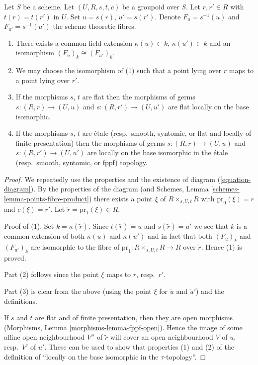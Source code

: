 \begin{lemma}
\label{lemma-two-fibres}
Let $S$ be a scheme.
Let $(U, R, s, t, c)$ be a groupoid over $S$.
Let $r, r' \in R$ with $t(r) = t(r')$ in $U$.
Set $u = s(r)$, $u' = s(r')$.
Denote $F_u = s^{-1}(u)$ and $F_{u'} = s^{-1}(u')$ the scheme
theoretic fibres.
\begin{enumerate}
\item There exists a common field extension
$\kappa(u) \subset k$, $\kappa(u') \subset k$ and
an isomorphism $(F_u)_k \cong (F_{u'})_k$.
\item We may choose the isomorphism of (1) such that a point
lying over $r$ maps to a point lying over $r'$.
\item If the morphisms $s$, $t$ are flat then the morphisms of germs
$s : (R, r) \to (U, u)$ and $s : (R, r') \to (U, u')$ are flat
locally on the base isomorphic.
\item If the morphisms $s$, $t$ are \'etale
(resp.\ smooth, syntomic, or flat and locally of finite presentation)
then the morphisms of germs $s : (R, r) \to (U, u)$ and
$s : (R, r') \to (U, u')$ are locally on the base isomorphic
in the \'etale (resp.\ smooth, syntomic, or fppf) topology.
\end{enumerate}
\end{lemma}

\begin{proof}
We repeatedly use the properties and the existence of
diagram (\ref{equation-diagram}).
By the properties of the diagram (and
Schemes, Lemma \ref{schemes-lemma-points-fibre-product})
there exists a point $\xi$ of $R \times_{s, U, t} R$
with $\text{pr}_0(\xi) = r$ and $c(\xi) = r'$.
Let $\tilde r = \text{pr}_1(\xi) \in R$.

\medskip\noindent
Proof of (1). Set $k = \kappa(\tilde r)$. Since $t(\tilde r) = u$
and $s(\tilde r) = u'$ we see that $k$ is a common extension
of both $\kappa(u)$ and $\kappa(u')$ and in fact that
both $(F_u)_k$ and $(F_{u'})_k$ are isomorphic to the fibre of
$\text{pr}_1 : R \times_{s, U, t} R \to R$ over $\tilde r$.
Hence (1) is proved.

\medskip\noindent
Part (2) follows since the point $\xi$ maps to $r$, resp.\ $r'$.

\medskip\noindent
Part (3) is clear from the above (using the point $\xi$ for
$\tilde u$ and $\tilde u'$) and the definitions.

\medskip\noindent
If $s$ and $t$ are flat and of finite presentation, then
they are open morphisms (Morphisms, Lemma \ref{morphisms-lemma-fppf-open}).
Hence the image of some affine open neighbourhood $V''$ of $\tilde r$ will
cover an open neighbourhood $V$ of $u$, resp.\ $V'$ of $u'$.
These can be used to show that properties (1) and (2) of the
definition of ``locally on the base isomorphic in the
$\tau$-topology''.
\end{proof}







